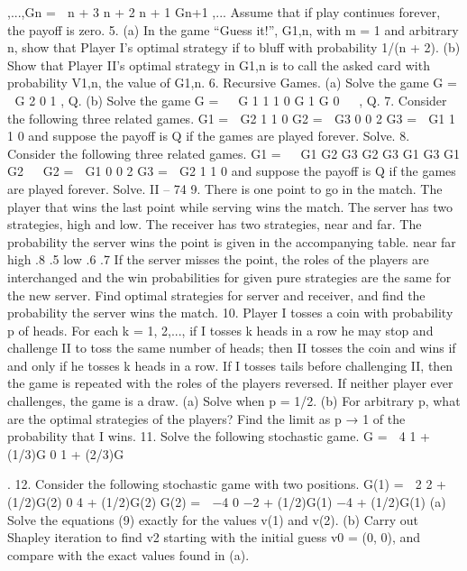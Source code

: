 ,...,Gn =
 n + 3 n + 2
n + 1 Gn+1
,...
Assume that if play continues forever, the payoff is zero.
5. (a) In the game “Guess it!”, G1,n, with m = 1 and arbitrary n, show that Player
I’s optimal strategy if to bluff with probability 1/(n + 2).
(b) Show that Player II’s optimal strategy in G1,n is to call the asked card with
probability V1,n, the value of G1,n.
6. Recursive Games. (a) Solve the game G =
 G 2
0 1
, Q.
(b) Solve the game G =
⎛
⎝
G 1 1
1 0 G
1 G 0
⎞
⎠ , Q.
7. Consider the following three related games.
G1 =
 G2 1
1 0
G2 =
 G3 0
0 2
G3 =
 G1 1
1 0
and suppose the payoff is Q if the games are played forever. Solve.
8. Consider the following three related games.
G1 =
⎛
⎝
G1 G2 G3
G2 G3 G1
G3 G1 G2
⎞
⎠ G2 =
 G1 0
0 2
G3 =
 G2 1
1 0
and suppose the payoff is Q if the games are played forever. Solve.
II – 74
9. There is one point to go in the match. The player that wins the last point while
serving wins the match. The server has two strategies, high and low. The receiver has
two strategies, near and far. The probability the server wins the point is given in the
accompanying table.
near far
high .8 .5
low .6 .7
If the server misses the point, the roles of the players are interchanged and the win probabilities
for given pure strategies are the same for the new server. Find optimal strategies
for server and receiver, and find the probability the server wins the match.
10. Player I tosses a coin with probability p of heads. For each k = 1, 2,..., if I tosses
k heads in a row he may stop and challenge II to toss the same number of heads; then II
tosses the coin and wins if and only if he tosses k heads in a row. If I tosses tails before
challenging II, then the game is repeated with the roles of the players reversed. If neither
player ever challenges, the game is a draw.
(a) Solve when p = 1/2.
(b) For arbitrary p, what are the optimal strategies of the players? Find the limit as p → 1
of the probability that I wins.
11. Solve the following stochastic game.
G =
 4 1 + (1/3)G
0 1 + (2/3)G

.
12. Consider the following stochastic game with two positions.
G(1) =
 2 2 + (1/2)G(2)
0 4 + (1/2)G(2)
G(2) =
 −4 0
−2 + (1/2)G(1) −4 + (1/2)G(1)
(a) Solve the equations (9) exactly for the values v(1) and v(2).
(b) Carry out Shapley iteration to find v2 starting with the initial guess v0 = (0, 0),
and compare with the exact values found in (a).

